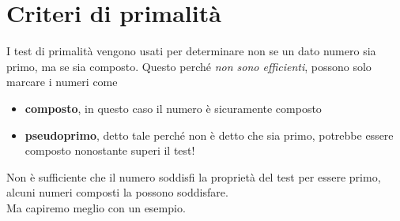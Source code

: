 \section{Criteri di primalità}
I test di primalità vengono usati per determinare non se un dato numero sia primo, ma se sia composto. Questo perché \textit{non sono efficienti}, possono solo marcare i numeri come 
\begin{itemize}
	\item \textbf{composto}, in questo caso il numero è sicuramente composto
	\item \textbf{pseudoprimo}, detto tale perché non è detto che sia primo, potrebbe essere composto nonostante superi il test!
\end{itemize}
Non è sufficiente che il numero soddisfi la proprietà del test per essere primo, alcuni numeri composti la possono soddisfare. \\ Ma capiremo meglio con un esempio.




